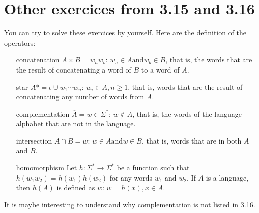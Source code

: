 \documentclass{article}
\newcommand\st{\colon\,}
\begin{document}
\section*{Other exercices from 3.15 and 3.16}

You can try to solve these exercices by yourself. Here are the definition of
the operators:
\begin{itemize}
\item[concatenation] \( A \times B = { w_a w_b \st w_a \in A \text{and} w_b \in
	B}\), that is, the
	words that are the result of concatenating a word of \(B\) to a word of
	\(A\).
\item[star] \( A* = { \epsilon } \cup { w_1 \cdots w_n \st w_i \in A, n \ge
	1}\), that is,
	words that are the result of concatenating any number of words from \(A\).
\item[complementation] \( \overline{A} = { w \in \Sigma^{*} \st w \not \in A
	}\), that is, the words of the language alphabet that are not in the
	language.
\item[intersection] \( A \cap B = {w \st w \in A \text{and} w \in B}\), that
	is, words that are in both \(A\) and \(B\).
\item[homomorphism] Let \(h \colon \Sigma^{*} \to \Sigma^{*}\)
	be a function such that \(h(w_1 w_2) = h(w_1) h(w_2)\) for any words
	\(w_1\) and \(w_2\). If \(A\) is
	a language, then \(h(A)\) is defined as \({ w \st w = h(x), x \in A}\).
\end{itemize}

It is maybe interesting to understand why complementation is not listed in
3.16.
\end{document}
